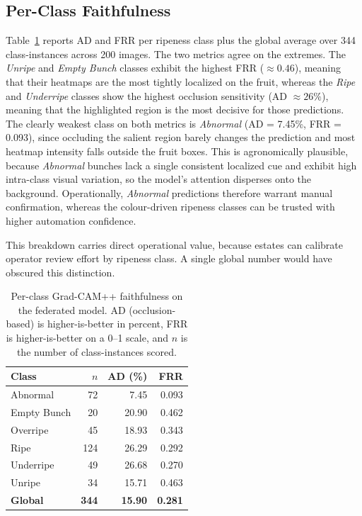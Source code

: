\documentclass[9pt,twocolumn]{extarticle}
\begin{document}
\subsection{Per-Class Faithfulness}

Table~\ref{tab:perclass} reports AD and FRR per ripeness class plus the global average over 344 class-instances across 200 images. The two metrics agree on the extremes. The \emph{Unripe} and \emph{Empty Bunch} classes exhibit the highest FRR ($\approx 0.46$), meaning that their heatmaps are the most tightly localized on the fruit, whereas the \emph{Ripe} and \emph{Underripe} classes show the highest occlusion sensitivity (AD $\approx 26\%$), meaning that the highlighted region is the most decisive for those predictions. The clearly weakest class on both metrics is \emph{Abnormal} (AD = 7.45\%, FRR = 0.093), since occluding the salient region barely changes the prediction and most heatmap intensity falls outside the fruit boxes. This is agronomically plausible, because \emph{Abnormal} bunches lack a single consistent localized cue and exhibit high intra-class visual variation, so the model's attention disperses onto the background. Operationally, \emph{Abnormal} predictions therefore warrant manual confirmation, whereas the colour-driven ripeness classes can be trusted with higher automation confidence.

This breakdown carries direct operational value, because estates can calibrate operator review effort by ripeness class. A single global number would have obscured this distinction.

\begin{table}[H]
  \centering
  \caption{Per-class Grad-CAM++ faithfulness on the federated model. AD (occlusion-based) is higher-is-better in percent, FRR is higher-is-better on a 0--1 scale, and $n$ is the number of class-instances scored.}
  \label{tab:perclass}
  \small
  \begin{tabular}{lrrr}
    \toprule
    Class & $n$ & AD (\%) & FRR \\
    \midrule
    Abnormal & 72 & 7.45 & 0.093 \\
    Empty Bunch & 20 & 20.90 & 0.462 \\
    Overripe & 45 & 18.93 & 0.343 \\
    Ripe & 124 & 26.29 & 0.292 \\
    Underripe & 49 & 26.68 & 0.270 \\
    Unripe & 34 & 15.71 & 0.463 \\
    \midrule
    \textbf{Global} & \textbf{344} & \textbf{15.90} & \textbf{0.281} \\
    \bottomrule
  \end{tabular}
\end{table}
\end{document}
